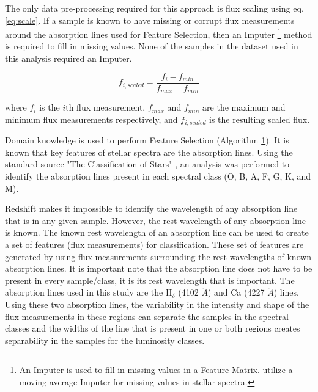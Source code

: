 \documentclass[./AutomatedMK.tex]{subfiles}
\begin{document}
The only data pre-processing required for this approach is flux scaling using eq. \eqref{eq:scale}. If a sample is known to have missing or corrupt flux measurements around the absorption lines used for Feature Selection, then an Imputer \footnote{An Imputer is used to fill in missing values in a Feature Matrix. \citet{brice} utilize a moving average Imputer for missing values in stellar spectra.} method is required to fill in missing values. None of the  samples in the dataset used in this analysis required an Imputer.

        \begin{equation}\label{eq:scale}
            f_{i, scaled} = \frac{f_i - f_{min}}{f_{max} - f_{min}}
        \end{equation}

where $f_i$ is the \(i\)th  flux measurement, $f_{max}$ and $f_{min}$ are the maximum and minimum flux measurements respectively, and $f_{i, scaled}$ is the resulting scaled flux.


Domain knowledge is used to perform Feature Selection (Algorithm \hyperlink{alg:FS}{1}). It is known that key features of stellar spectra are the absorption lines. Using the standard source "The Classification of Stars" \citep{Jaschek}, an analysis was performed to identify the absorption lines present in each spectral class (O, B, A, F, G, K, and M). 

Redshift makes it impossible to identify the wavelength of any absorption line that is in any given sample. However, the rest wavelength of any absorption line is known. The known rest wavelength of an absorption line can be used to create a set of features (flux measurements) for classification. These set of features are generated by using flux measurements surrounding the rest wavelengths of known absorption lines. It is important note that the absorption line does not have to be present in every sample/class, it is its rest wavelength that is important. The absorption lines used in this study are the H$_\delta$ (4102 $\mathring{A}$) and Ca  (4227 $\mathring{A}$) lines. Using these two absorption lines, the variability in the intensity and shape of the flux measurements in these regions can separate the samples in the spectral classes and the widths of the line that is present in one or both regions creates separability in the samples for the luminosity classes.
\end{document}
